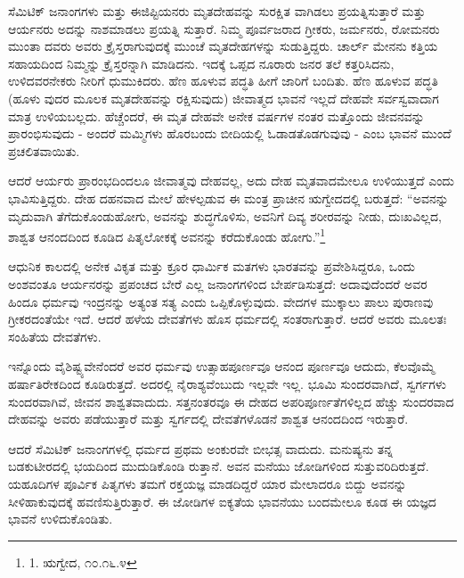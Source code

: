 ಸೆಮಿಟಿಕ್ ಜನಾಂಗಗಳು ಮತ್ತು ಈಜಿಪ್ಟಿಯನರು ಮೃತದೇಹವನ್ನು ಸುರಕ್ಷಿತ ವಾಗಿಡಲು ಪ್ರಯತ್ನಿಸುತ್ತಾರೆ ಮತ್ತು ಆರ್ಯನರು ಅದನ್ನು ನಾಶಮಾಡಲು ಪ್ರಯತ್ನಿ ಸುತ್ತಾರೆ. ನಿಮ್ಮ ಪೂರ್ವಜರಾದ ಗ್ರೀಕರು, ಜರ್ಮನರು, ರೋಮನರು ಮುಂತಾ ದವರು ಅವರು ಕ್ರೈಸ್ತರಾಗುವುದಕ್ಕೆ ಮುಂಚೆ ಮೃತದೇಹಗಳನ್ನು ಸುಡುತ್ತಿದ್ದರು. ಚಾರ್ಲ್ ಮೇನನು ಕತ್ತಿಯ ಸಹಾಯದಿಂದ ನಿಮ್ಮನ್ನು ಕ್ರೈಸ್ತರನ್ನಾಗಿ ಮಾಡಿದನು. ಇದಕ್ಕೆ ಒಪ್ಪದ ನೂರಾರು ಜನರ ತಲೆ ಕತ್ತರಿಸಿದನು, ಉಳಿದವರನೇಕರು ನೀರಿಗೆ ಧುಮುಕಿದರು. ಹೆಣ ಹೂಳುವ ಪದ್ಧತಿ ಹೀಗೆ ಜಾರಿಗೆ ಬಂದಿತು. ಹೆಣ ಹೂಳುವ ಪದ್ಧತಿ (ಹೂಳು ವುದರ ಮೂಲಕ ಮೃತದೇಹವನ್ನು ರಕ್ಷಿಸುವುದು) ಜೀವಾತ್ಮದ ಭಾವನೆ ಇಲ್ಲದೆ ದೇಹವೇ ಸರ್ವಸ್ವವಾದಾಗ ಮಾತ್ರ ಉಳಿಯಬಲ್ಲದು. ಹೆಚ್ಚೆಂದರೆ, ಈ ಮೃತ ದೇಹವೇ ಅನೇಕ ವರ್ಷಗಳ ನಂತರ ಮತ್ತೊಂದು ಜೀವನವನ್ನು ಪ್ರಾರಂಭಿಸುವುದು - ಅಂದರೆ ಮಮ್ಮಿಗಳು ಹೊರಬಂದು ಬೀದಿಯಲ್ಲಿ ಓಡಾಡತೊಡಗುವುವು - ಎಂಬ ಭಾವನೆ ಮುಂದೆ ಪ್ರಚಲಿತವಾಯಿತು.

ಆದರೆ ಆರ್ಯರು ಪ್ರಾರಂಭದಿಂದಲೂ ಜೀವಾತ್ಮವು ದೇಹವಲ್ಲ, ಅದು ದೇಹ ಮೃತವಾದಮೇಲೂ ಉಳಿಯುತ್ತದೆ ಎಂದು ಭಾವಿಸುತ್ತಿದ್ದರು. ದೇಹ ದಹನವಾದ ಮೇಲೆ ಹೇಳಲ್ಪಡುವ ಈ ಮಂತ್ರ ಪ್ರಾಚೀನ ಋಗ್ವೇದದಲ್ಲಿ ಬರುತ್ತದೆ: “ಅವನನ್ನು ಮೃದುವಾಗಿ ತೆಗೆದುಕೊಂಡುಹೋಗು, ಅವನನ್ನು ಶುದ್ಧಗೊಳಿಸು, ಅವನಿಗೆ ದಿವ್ಯ ಶರೀರವನ್ನು ನೀಡು, ದುಃಖವಿಲ್ಲದ, ಶಾಶ್ವತ ಆನಂದದಿಂದ ಕೂಡಿದ ಪಿತೃಲೋಕಕ್ಕೆ ಅವನನ್ನು ಕರೆದುಕೊಂಡು ಹೋಗು.”\footnote{1. ಋಗ್ವೇದ, ೧೦.೧೬.೪}

ಆಧುನಿಕ ಕಾಲದಲ್ಲಿ ಅನೇಕ ವಿಕೃತ ಮತ್ತು ಕ್ರೂರ ಧಾರ್ಮಿಕ ಮತಗಳು ಭಾರತವನ್ನು ಪ್ರವೇಶಿಸಿದ್ದರೂ, ಒಂದು ಅಂಶವಂತೂ ಆರ್ಯನರನ್ನು ಪ್ರಪಂಚದ ಬೇರೆ ಎಲ್ಲ ಜನಾಂಗಗಳಿಂದ ಬೇರ್ಪಡಿಸುತ್ತದೆ: ಅದಾವುದೆಂದರೆ ಅವರ ಹಿಂದೂ ಧರ್ಮವು ಇಂದ್ರನನ್ನು ಅತ್ಯಂತ ಸತ್ಯ ಎಂದು ಒಪ್ಪಿಕೊಳ್ಳುವುದು. ವೇದಗಳ ಮುಕ್ಕಾಲು ಪಾಲು ಪುರಾಣವು ಗ್ರೀಕರದಂತೆಯೇ ಇದೆ. ಆದರೆ ಹಳೆಯ ದೇವತೆಗಳು ಹೊಸ ಧರ್ಮದಲ್ಲಿ ಸಂತರಾಗುತ್ತಾರೆ. ಆದರೆ ಅವರು ಮೂಲತಃ ಸಂಹಿತೆಯ ದೇವತೆಗಳು.

ಇನ್ನೊಂದು ವೈಶಿಷ್ಟ್ಯವೇನೆಂದರೆ ಅವರ ಧರ್ಮವು ಉತ್ಸಾಹಪೂರ್ಣವೂ ಆನಂದ ಪೂರ್ಣವೂ ಆದುದು, ಕೆಲವೊಮ್ಮೆ ಹರ್ಷಾತಿರೇಕದಿಂದ ಕೂಡಿರುತ್ತದೆ. ಅದರಲ್ಲಿ ನೈರಾಶ್ಯವೆಂಬುದು ಇಲ್ಲವೇ ಇಲ್ಲ. ಭೂಮಿ ಸುಂದರವಾಗಿದೆ, ಸ್ವರ್ಗಗಳು ಸುಂದರವಾಗಿವೆ, ಜೀವನ ಶಾಶ್ವತವಾದುದು. ಸತ್ತನಂತರವೂ ಈ ದೇಹದ ಅಪರಿಪೂರ್ಣತೆಗಳಿಲ್ಲದ ಹೆಚ್ಚು ಸುಂದರವಾದ ದೇಹವನ್ನು ಅವರು ಪಡೆಯುತ್ತಾರೆ ಮತ್ತು ಸ್ವರ್ಗದಲ್ಲಿ ದೇವತೆಗಳೊಡನೆ ಶಾಶ್ವತ ಆನಂದದಿಂದ ಇರುತ್ತಾರೆ.

ಆದರೆ ಸೆಮಿಟಿಕ್ ಜನಾಂಗಗಳಲ್ಲಿ ಧರ್ಮದ ಪ್ರಥಮ ಅಂಕುರವೇ ಬೀಭತ್ಸ ವಾದುದು. ಮನುಷ್ಯನು ತನ್ನ ಬಡಕುಟೀರದಲ್ಲಿ ಭಯದಿಂದ ಮುದುಡಿಕೊಂಡಿ ರುತ್ತಾನೆ. ಅವನ ಮನೆಯು ಜೋಡಿಗಳಿಂದ ಸುತ್ತುವರಿದಿರುತ್ತದೆ. ಯಹೂದಿಗಳ ಪೂರ್ವಿಕ ಪಿತೃಗಳು ತಮಗೆ ರಕ್ತಯಜ್ಞ ಮಾಡದಿದ್ದರೆ ಯಾರ ಮೇಲಾದರೂ ಬಿದ್ದು ಅವನನ್ನು ಸೀಳಿಹಾಕುವುದಕ್ಕೆ ಹವಣಿಸುತ್ತಿರುತ್ತಾರೆ. ಈ ಜೋಡಿಗಳ ಐಕ್ಯತೆಯ ಭಾವನೆಯು ಬಂದಮೇಲೂ ಕೂಡ ಈ ಯಜ್ಞದ ಭಾವನೆ ಉಳಿದುಕೊಂಡಿತು.

